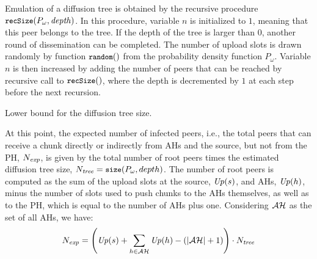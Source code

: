 Emulation of a diffusion tree is obtained by the recursive procedure
$\texttt{\small recSize}(P_{\omega}, {\mathit{depth}})$. In this procedure, variable $n$ is
initialized to $1$, meaning that this peer belongs to the tree. If the depth
of the tree is larger than $0$, another round of dissemination can be
completed. The number of upload slots is drawn randomly by function
$\texttt{\small random}()$ from the probability density function $P_{\omega}$. Variable $n$
is then increased by adding the number of peers that can be reached by
recursive call to $\texttt{\small recSize}()$, where the depth is decremented by $1$ at
each step before the next recursion.
\begin{algorithm}[!ht]
\caption{Lower bound for the diffusion tree size.}
\label{src:infected}
\begin{scriptsize}
\BlankLine
{}
\end{scriptsize}
\end{algorithm}

At this point, the expected number of infected peers, i.e., the total peers
that can receive a chunk directly or indirectly from AHs and the source, but
not from the PH, $N_{\mathit{exp}}$, is given by the total number of root peers times the
estimated diffusion tree size, $N_{\mathit{tree}} = \texttt{\small size}(P_{\omega}, depth)$. The
number of root peers is computed as the sum of the upload slots at the
source, $\mathit{Up}(s)$, and AHs, $\mathit{Up}(h)$, minus the number of slots used to
push chunks to the AHs themselves, as well as to the PH, which is equal to the
number of AHs plus one. Considering ${\mathcal{AH}}$ as the set of all AHs, we have:
\begin{equation}\label{eq:n}
  N_{\mathit{exp}} = \left(\mathit{Up}(s) + \sum_{h \in \mathit{{\mathcal{AH}}} } \mathit{Up}(h) - \left( |{\mathcal{AH}}| + 1 \right) \right) \cdot N_{\mathit{tree}} 
\end{equation}


